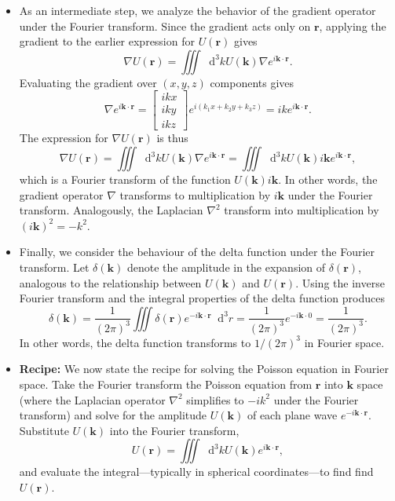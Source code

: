 \documentclass[11pt, a4paper]{article}
\newcommand{\diff}{\mathop{}\!\mathrm{d}} %
\renewcommand{\vec}[1]{\bm{#1}} %
\renewcommand{\r}{\vec{r}}
\renewcommand{\grad}{\nabla}
\renewcommand{\laplacian}{\nabla^{2}}
\begin{document}
\begin{itemize}
    \item As an intermediate step, we analyze the behavior of the gradient operator under the Fourier transform. Since the gradient acts only on $ \r $, applying the gradient to the earlier expression for $ U(\r) $ gives
	\begin{equation*}
		\grad U(\r) = \iiint \diff^{3}k U(\vec{k}) \grad e^{i \vec{k}\cdot \r}.
	\end{equation*}
	Evaluating the gradient over $ (x, y, z) $ components gives
	\begin{equation*}
		\grad e^{i \vec{k}\cdot \r} = 
		\begin{bmatrix}
			ikx\\
			iky\\
			ikz
		\end{bmatrix}
		e^{i(k_{1}x + k_{2}y + k_{3}z)} = ik e^{i\vec{k}\cdot \r}.
	\end{equation*}
    The expression for $ \grad U(\r) $ is thus
	\begin{equation*}
		\grad U(\r) = \iiint \diff^{3}k U(\vec{k}) \grad e^{i \vec{k}\cdot \r} = \iiint \diff^{3}k U(\vec{k})i \vec{k} e^{i \vec{k}\cdot \r},
	\end{equation*}
	which is a Fourier transform of the function $ U(\vec{k})i \vec{k} $. In other words, the gradient operator $ \grad $ transforms to multiplication by $ i\vec{k} $ under the Fourier transform. Analogously, the Laplacian $ \nabla^{2} $ transform into multiplication by $ (i\vec{k})^{2} = - k^{2} $. 
	
	\item Finally, we consider the behaviour of the delta function under the Fourier transform. Let $ \delta(\vec{k}) $ denote the amplitude in the expansion of $ \delta(\r) $, analogous to the relationship between $ U(\vec{k}) $ and $ U(\r) $. Using the inverse Fourier transform and the integral properties of the delta function produces
	\begin{equation*}
		\delta (\vec{k}) = \frac{1}{(2\pi)^{3}} \iiint \delta(\r) e^{-i\vec{k}\cdot\r}\diff^{3}r = \frac{1}{(2\pi)^{3}} e^{-i\vec{k}\cdot 0} = \frac{1}{(2\pi)^{3}}.
	\end{equation*}
    In other words, the delta function transforms to $ 1/(2\pi)^{3} $ in Fourier space.
	
	\item \textbf{Recipe:} We now state the recipe for solving the Poisson equation in Fourier space. Take the Fourier transform the Poisson equation from $ \r $ into $ \vec{k} $ space (where the Laplacian operator $ \laplacian $ simplifies to $ -ik^{2} $ under the Fourier transform) and solve for the amplitude $ U(\vec{k}) $ of each plane wave $ e^{-i\vec{k}\cdot \r} $. Substitute $ U(\vec{k}) $ into the Fourier transform,
	\begin{equation*}
		U(\r) = \iiint \diff^{3}k U(\vec{k}) e^{i \vec{k}\cdot \r},
	\end{equation*}
	and evaluate the integral---typically in spherical coordinates---to find find $ U(\r) $. 
	
	
    
\end{itemize}
\end{document}
